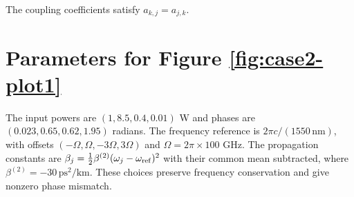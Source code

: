 \documentclass[11pt,a4paper]{article}
\numberwithin{equation}{section}
\begin{document}
\vspace{1em}

\noindent
The coupling coefficients satisfy $a_{k,j}=a_{j,k}$.


\section{Parameters for Figure \ref{fig:case2-plot1}}
\label{app:case2-params}
The input powers are $(1,8.5,0.4,0.01)$ W and phases are $(0.023,0.65,0.62,1.95)$ radians.
The frequency reference is $2\pi c/(1550\,\mathrm{nm})$, with offsets $(-\Omega,\Omega,-3\Omega,3\Omega)$ and $\Omega=2\pi\times100$ GHz.
The propagation constants are $\beta_j=\tfrac12\beta^{(2)}(\omega_j-\omega_{\rm ref})^2$ with their common mean subtracted, where $\beta^{(2)}=-30\,\mathrm{ps}^2/\mathrm{km}$.
These choices preserve frequency conservation and give nonzero phase mismatch.
\end{document}
